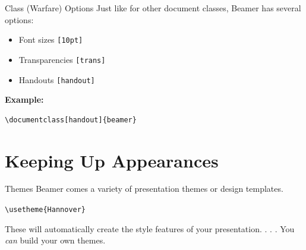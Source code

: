 \documentclass[mathserif, xcolor=svgnames]{beamer}
\begin{document}
\begin{frame}[fragile, label=fourth]{Class (Warfare) Options}
Just like for other document classes, Beamer has several options:

\begin{itemize}
\item Font sizes \verb+[10pt]+
\item Transparencies \verb+[trans]+
\item Handouts \verb+[handout]+
\end{itemize}
\vspace{10pt}
\textbf{Example:}
\begin{verbatim}
\documentclass[handout]{beamer}
\end{verbatim}

\end{frame}


\section{Keeping Up Appearances}
\begin{frame}[fragile, label=fifth]{Themes}
Beamer comes a variety of presentation themes or design templates.

\vspace{10pt}

\verb+\usetheme{Hannover}+

\vspace{10pt}

These will automatically create the style features of your presentation. . . . \pause  You \textit{can} build your own themes.

\end{frame}
\end{document}

